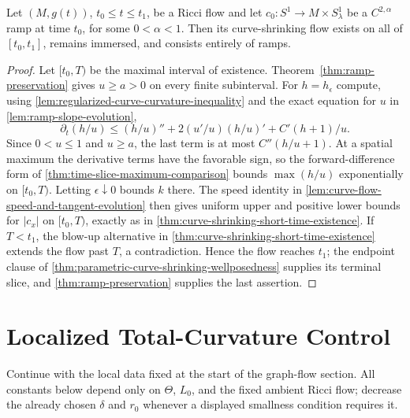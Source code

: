 \begin{theorem}
\label{thm:ramp-curve-shrinking-global-existence}
\notready
Let $(M,g(t))$, $t_0\le t\le t_1$, be a Ricci flow and let
$c_0\colon S^1\to M\times S^1_\lambda$ be a $C^{2,\alpha}$ ramp at time
$t_0$, for some $0<\alpha<1$.
Then its curve-shrinking flow exists on all of $[t_0,t_1]$, remains immersed,
and consists entirely of ramps.
\end{theorem}
\begin{proof}
Let $[t_0,T)$ be the maximal interval of existence.
Theorem~\ref{thm:ramp-preservation} gives
$u\ge a>0$ on every finite subinterval.  For $h=h_\epsilon$ compute, using
\ref{lem:regularized-curve-curvature-inequality} and the exact equation for
$u$ in \ref{lem:ramp-slope-evolution},
\[
 \partial_t(h/u)\le (h/u)''+2(u'/u)(h/u)'
             +C'(h+1)/u.
\]
Since $0<u\le1$ and $u\ge a$, the last term is at most
$C''(h/u+1)$.  At a spatial maximum the derivative terms have the favorable
sign, so the forward-difference form of
\ref{thm:time-slice-maximum-comparison} bounds
$\max(h/u)$ exponentially on $[t_0,T)$.  Letting $\epsilon\downarrow0$
bounds $k$ there.  The speed identity in
\ref{lem:curve-flow-speed-and-tangent-evolution} then gives uniform upper and
positive lower bounds for $|c_x|$ on $[t_0,T)$, exactly as in
\ref{thm:curve-shrinking-short-time-existence}.  If $T<t_1$, the blow-up
alternative in
\ref{thm:curve-shrinking-short-time-existence} extends the flow past $T$, a
contradiction.  Hence the flow reaches $t_1$; the endpoint clause of
\ref{thm:parametric-curve-shrinking-wellposedness} supplies its terminal
slice, and \ref{thm:ramp-preservation} supplies the last assertion.
\end{proof}

\section{Localized Total-Curvature Control}

Continue with the local data fixed at the start of the graph-flow section.
All constants below depend only on $\Theta$, $L_0$, and the fixed ambient
Ricci flow; decrease the already chosen $\delta$ and $r_0$ whenever a
displayed smallness condition requires it.

